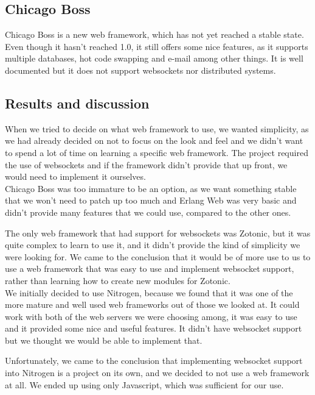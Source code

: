\documentclass[11pt,a4paper]{report}
\begin{document}
\subsection{Chicago Boss}
Chicago Boss\cite{chicagoboss} is a new web framework, which has not yet reached
a stable state. Even though it hasn't reached 1.0, it still offers some nice
features, as it supports multiple databases, hot code swapping and e-mail among
other things. It is well documented but it does not support websockets nor
distributed systems.

\subsection{Results and discussion}
When we tried to decide on what web framework to use, we wanted simplicity, as
we had already decided on not to focus on the look and feel and we didn't want
to spend a lot of time on learning a specific web framework.
The project required the use of websockets and if the framework didn't
provide that up front, we would need to implement it ourselves.\\

Chicago Boss was too immature to be an option, as we want something stable that
we won't need to patch up too much and Erlang Web was very basic and didn't
provide many features that we could use, compared to the other ones.

The only web framework that had support for websockets was Zotonic, but it was
quite complex to learn to use it, and it didn't provide the kind of simplicity
we were looking for. We came to the conclusion that it would be of more use to
us to use a web framework that was easy to use and implement websocket support,
rather than learning how to create new modules for Zotonic.\\

We initially decided to use Nitrogen, because we found that it was one of the
more mature and well used web frameworks out of those we looked at. It could
work with both of the web servers we were choosing among, it was easy to use and
it provided some nice and useful features. It didn't have websocket support but
we thought we would be able to implement that.

Unfortunately, we came to the conclusion that implementing websocket support
into Nitrogen is a project on its own, and we decided to not use a web
framework at all. We ended up using only Javascript, which was sufficient for
our use.
\end{document}
